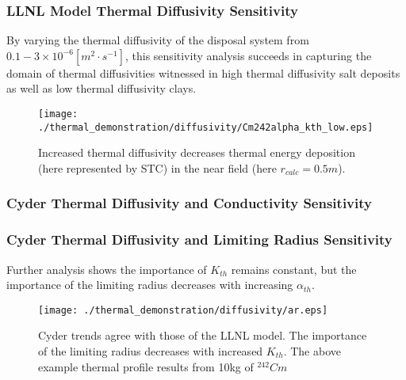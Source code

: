 
\begin{frame}[ctb!]
\frametitle{LLNL Model Thermal Diffusivity Sensitivity}
\footnotesize{
By varying the thermal diffusivity of the disposal system from $0.1-3\times 
10^{-6} [m^2\cdot s^{-1}]$, this sensitivity analysis succeeds in capturing the domain of 
thermal diffusivities witnessed in high thermal diffusivity salt deposits as 
well as low thermal diffusivity clays.

\begin{figure}[htbp!]
\begin{center}
\texttt{[image: ./thermal\_demonstration/diffusivity/Cm242alpha\_kth\_low.eps]}
\end{center}
\caption[$K_{th}$ Sensitivity to $\alpha_{th}$ for $k_{th}$]{Increased thermal diffusivity decreases thermal energy deposition 
(here represented by STC) in the near field (here $r_{calc} = 0.5m$).}
\label{fig:Cm242alpha_kth_low}
\end{figure}
}
\end{frame}


\begin{frame}[ctb!]
\frametitle{Cyder Thermal Diffusivity and Conductivity Sensitivity}
\end{frame}

\begin{frame}[ctb!]
\frametitle{Cyder Thermal Diffusivity and Limiting Radius Sensitivity}
\footnotesize{
Further \Cyder analysis shows the importance of $K_{th}$ remains constant, but 
the importance of the limiting radius decreases with increasing $\alpha_{th}$.
\begin{figure}[htbp!]
\begin{center}
\texttt{[image: ./thermal\_demonstration/diffusivity/ar.eps]}
\end{center}
\caption[$\alpha_{th}$ vs. $r_{lim}$ Sensitivity in Cyder]
{Cyder trends agree with 
those of the LLNL model. The importance of the limiting radius decreases with 
increased $K_{th}$. The above example thermal profile results from 10kg of 
$^{242}Cm$}
\label{fig:ak}
\end{figure}
}
\end{frame}
